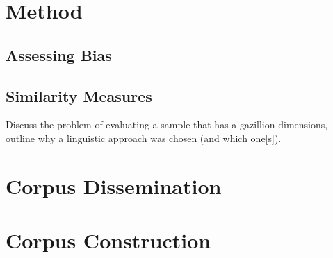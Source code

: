 
\section{Method}
\subsection{Assessing Bias}

\subsection{Similarity Measures}
Discuss the problem of evaluating a sample that has a gazillion dimensions, outline why a linguistic approach was chosen (and which one[s]).


\section{Corpus Dissemination}
\section{Corpus Construction}
